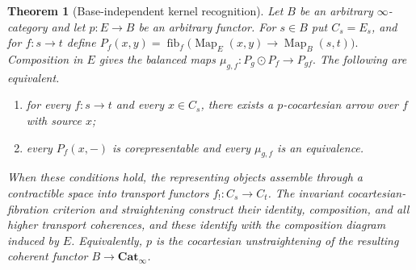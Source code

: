 \documentclass[oneside]{article}
\theoremstyle{plain}
\newtheorem{theorem}{Theorem}[section]
\theoremstyle{definition}
\theoremstyle{remark}
\newcommand{\Cat}{\mathbf{Cat}_{\infty}}
\newcommand{\Map}{\operatorname{Map}}
\newcommand{\fib}{\operatorname{fib}}
\begin{document}
\begin{theorem}[Base-independent kernel recognition]\label{thz:thm:kernel-recognition}
Let $B$ be an arbitrary $\infty$-category and let $p:E\to B$ be an arbitrary
functor.  For $s\in B$ put $C_s=E_s$, and for $f:s\to t$ define $P_f(x,y)=\fib_f\bigl( \Map_E(x,y)\longrightarrow\Map_B(s,t) \bigr).$ Composition in $E$ gives the balanced maps $\mu_{g,f}:P_g\odot P_f\longrightarrow P_{gf}.$ The following are equivalent.
\begin{enumerate}\renewcommand{\labelenumi}{(\roman{enumi})}
\item for every $f:s\to t$ and every $x\in C_s$, there exists a
      $p$-cocartesian arrow over $f$ with source $x$;
\item every $P_f(x,-)$ is corepresentable and every $\mu_{g,f}$ is an
      equivalence.
\end{enumerate}
When these conditions hold, the representing objects assemble through a
contractible space into transport functors $f_!:C_s\to C_t$.  The invariant
cocartesian-fibration criterion and straightening construct their identity,
composition, and all higher transport coherences, and these identify with the
composition diagram induced by $E$.  Equivalently, $p$ is the cocartesian
unstraightening of the resulting coherent functor
$B\to\Cat$.
\end{theorem}
\end{document}
